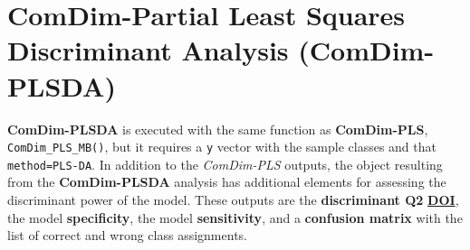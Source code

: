 \documentclass[
]{book}
\newenvironment{Shaded}{\begin{snugshade}}{\end{snugshade}}
\newcommand{\AttributeTok}[1]{\textcolor[rgb]{0.77,0.63,0.00}{#1}}
\newcommand{\CommentTok}[1]{\textcolor[rgb]{0.56,0.35,0.01}{\textit{#1}}}
\newcommand{\DecValTok}[1]{\textcolor[rgb]{0.00,0.00,0.81}{#1}}
\newcommand{\FunctionTok}[1]{\textcolor[rgb]{0.00,0.00,0.00}{#1}}
\newcommand{\NormalTok}[1]{#1}
\newcommand{\OtherTok}[1]{\textcolor[rgb]{0.56,0.35,0.01}{#1}}
\newcommand{\SpecialCharTok}[1]{\textcolor[rgb]{0.00,0.00,0.00}{#1}}
\newcommand{\StringTok}[1]{\textcolor[rgb]{0.31,0.60,0.02}{#1}}
\begin{document}
\begin{Shaded}
\end{Shaded}

\hypertarget{PLS-DA}{%
\section{ComDim-Partial Least Squares Discriminant Analysis (ComDim-PLSDA)}\label{PLS-DA}}

\textbf{ComDim-PLSDA} is executed with the same function as \textbf{ComDim-PLS},
\texttt{ComDim\_PLS\_MB()}, but it requires a \texttt{y} vector with the sample classes and that
\texttt{method=\textquotesingle{}PLS-DA}.
In addition to the \emph{ComDim-PLS} outputs, the object resulting from the
\textbf{ComDim-PLSDA} analysis has additional elements for assessing the discriminant
power of the model. These outputs are the \textbf{discriminant Q2} \href{https://doi.org/10.1007/s11306-008-0126-2}{\textbf{DOI}}, the model \textbf{specificity},
the model \textbf{sensitivity}, and a \textbf{confusion matrix} with the list of correct
and wrong class assignments.
\end{document}
